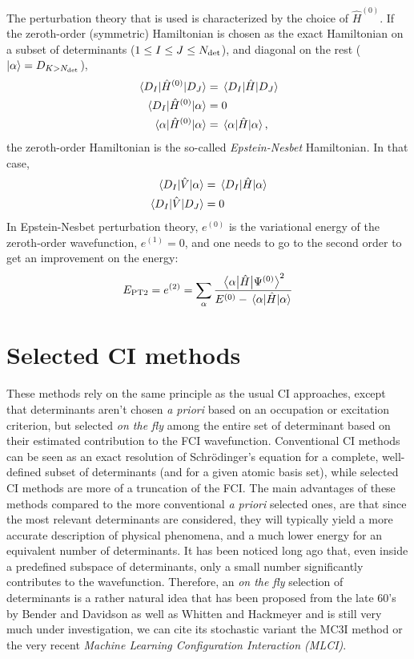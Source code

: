 \documentclass[./thesis.tex]{subfiles}
\begin{document}
The perturbation theory that is used is characterized by the choice of $\hat{H}^{(0)}$.
If the zeroth-order (symmetric) Hamiltonian is chosen as the exact Hamiltonian on a subset of determinants ($1 \le I \le J \le {N_\text{det}}$), and diagonal on the rest (${\ket{\alpha}} = D_{K > {N_\text{det}}}$), 
\begin{align}
\mel{D_I}{\hat{H}^{(0)}}{D_J} & = \mel{D_I}{\hat{H}}{D_J} \\
\mel{D_I}{\hat{H}^{(0)}}{\alpha} & = 0 \\
\mel{\alpha}{\hat{H}^{(0)}}{\alpha} & = \mel{\alpha}{\hat{H}}{\alpha}, \\
\end{align}
the zeroth-order Hamiltonian is the so-called \emph{Epstein-Nesbet} Hamiltonian. In that case,
\begin{align}
\mel{D_I}{\hat{V}}{\alpha} & = \mel{D_I}{\hat{H}}{\alpha} \\
\mel{D_I}{\hat{V}}{D_J} & = 0 \\
\end{align}
In Epstein-Nesbet perturbation theory, $e^{(0)}$ is the variational energy of
the zeroth-order wavefunction, $e^{(1)} = 0$, and one needs to go to the second
order to get an improvement on the energy:
\begin{equation}
E_\text{PT2} = e^{(2)} = \sum_{\alpha} \frac{\mel{\alpha}{\hat{H}}{\Psi^{(0)}}^2}{E^{(0)} - \mel{\alpha}{\hat{H}}{\alpha}}
\end{equation}



\section{Selected CI methods}
\label{sec:meth_cipsi}

These methods rely on the same principle as the usual CI approaches, except that determinants aren't chosen \textit{a priori} based on an occupation or excitation criterion, but selected \emph{on the fly} among the entire set of determinant based on their estimated contribution to the FCI wavefunction. Conventional CI methods can be seen as an exact resolution of Schrödinger's equation for a complete, well-defined subset of determinants (and for a given atomic basis set), while selected CI methods are more of a truncation of the FCI.
The main advantages of these methods compared to the more conventional \textit{a priori} selected ones, are that since the most relevant determinants are considered, they will typically yield a more accurate description of physical phenomena, and a much lower energy for an equivalent number of determinants.
It has been noticed long ago that, even inside a predefined subspace of determinants, only a small number significantly contributes to the wavefunction.\cite{Bytautas_2009,Anderson_2018} Therefore, an \emph{on the fly} selection of determinants is a rather natural idea that has been proposed from the late 60's by Bender and Davidson\cite{Bender_1969} as well as Whitten and Hackmeyer\cite{Whitten_1969} and is still very much under investigation, we can cite its stochastic variant the MC3I method\cite{Ohtsuka_2017} or the very recent \emph{Machine Learning Configuration Interaction (MLCI)}.\cite{1808.05787}
\end{document}
